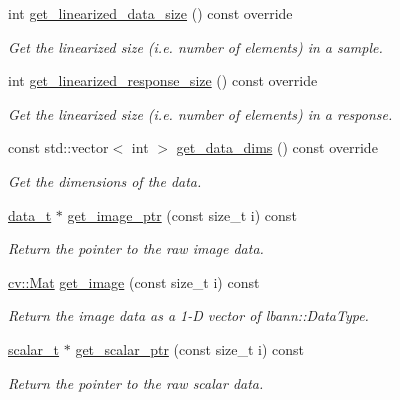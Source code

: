 \begin{DoxyCompactItemize}
int \hyperlink{classlbann_1_1data__reader__jag_aaf9fbe3e290dc1d4bb13fb203e33e313}{get\+\_\+linearized\+\_\+data\+\_\+size} () const override
\begin{DoxyCompactList}\small\item\em Get the linearized size (i.\+e. number of elements) in a sample. \end{DoxyCompactList}\item 
int \hyperlink{classlbann_1_1data__reader__jag_ad8e4752ead359374c9c7c10becf6aec1}{get\+\_\+linearized\+\_\+response\+\_\+size} () const override
\begin{DoxyCompactList}\small\item\em Get the linearized size (i.\+e. number of elements) in a response. \end{DoxyCompactList}\item 
const std\+::vector$<$ int $>$ \hyperlink{classlbann_1_1data__reader__jag_af724f9e38e98e9a4d46f18e7ccadcbb3}{get\+\_\+data\+\_\+dims} () const override
\begin{DoxyCompactList}\small\item\em Get the dimensions of the data. \end{DoxyCompactList}\item 
\hyperlink{classlbann_1_1data__reader__jag_a7377d6c02c455f019a378489b9b8eab4}{data\+\_\+t} $\ast$ \hyperlink{classlbann_1_1data__reader__jag_aab51581a1b8175bf5da1b74454ef7701}{get\+\_\+image\+\_\+ptr} (const size\+\_\+t i) const
\begin{DoxyCompactList}\small\item\em Return the pointer to the raw image data. \end{DoxyCompactList}\item 
\hyperlink{base_8hpp_a68f11fdc31b62516cb310831bbe54d73}{cv\+::\+Mat} \hyperlink{classlbann_1_1data__reader__jag_aee6e15cf6eda3bc97d1f7b077d74747a}{get\+\_\+image} (const size\+\_\+t i) const
\begin{DoxyCompactList}\small\item\em Return the image data as a 1-\/D vector of lbann\+::\+Data\+Type. \end{DoxyCompactList}\item 
\hyperlink{classlbann_1_1data__reader__jag_aa2e01bc071588b9c1a583e5a752abcc6}{scalar\+\_\+t} $\ast$ \hyperlink{classlbann_1_1data__reader__jag_abaa3c00c30ebaa54d395c93f0225570c}{get\+\_\+scalar\+\_\+ptr} (const size\+\_\+t i) const
\begin{DoxyCompactList}\small\item\em Return the pointer to the raw scalar data. \end{DoxyCompactList}\item 

\end{DoxyCompactItemize}
